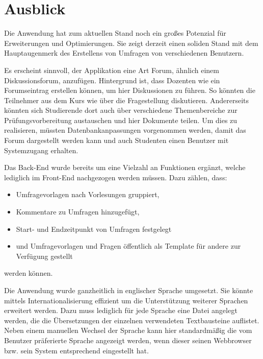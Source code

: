 \section{Ausblick}
\label{sec:Ausblick}

Die Anwendung hat zum aktuellen Stand noch ein großes Potenzial für Erweiterungen und Optimierungen.
Sie zeigt derzeit einen soliden Stand mit dem Hauptaugenmerk des Erstellens von Umfragen von verschiedenen Benutzern.

Es erscheint sinnvoll, der Applikation eine Art Forum, ähnlich einem Diskussionsforum, anzufügen.
Hintergrund ist, dass \zb Dozenten wie \dutzi ein Forumseintrag erstellen können, um hier Diskussionen zu führen.
So könnten die Teilnehmer aus dem Kurs wie \weigert über die Fragestellung diskutieren.
Andererseits könnten sich Studierende dort auch über verschiedene Themenbereiche zur Prüfungsvorbereitung austauschen und hier Dokumente teilen. \newline
Um dies zu realisieren, müssten Datenbankanpassungen vorgenommen werden, damit das Forum dargestellt werden kann und auch Studenten einen Benutzer mit Systemzugang erhalten.

Das Back-End wurde bereits um eine Vielzahl an Funktionen ergänzt, welche lediglich im Front-End nachgezogen werden müssen.
Dazu zählen, dass:
%
\begin{itemize}
    \item Umfragevorlagen \zb nach Vorlesungen gruppiert,
    \item Kommentare zu Umfragen hinzugefügt,
    \item Start- und Endzeitpunkt von Umfragen festgelegt
    \item und Umfragevorlagen und Fragen öffentlich als Template für andere zur Verfügung gestellt
\end{itemize}
%
werden können.

Die Anwendung wurde ganzheitlich in englischer Sprache umgesetzt.
Sie könnte mittels Internationalisierung effizient um die Unterstützung weiterer Sprachen erweitert werden.
Dazu muss lediglich für jede Sprache eine Datei angelegt werden, die die Übersetzungen der einzelnen verwendeten Textbausteine auflistet.
Neben einem manuellen Wechsel der Sprache kann hier standardmäßig die vom Benutzer präferierte Sprache angezeigt werden, wenn dieser seinen Webbrowser bzw. sein System entsprechend eingestellt hat.

